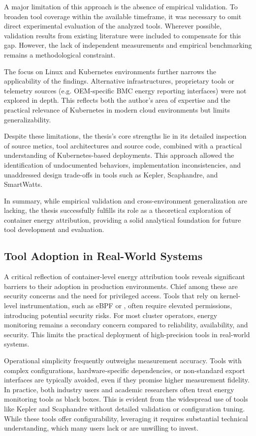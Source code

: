 A major limitation of this approach is the absence of empirical validation. To broaden tool coverage within the available timeframe, it was necessary to omit direct experimental evaluation of the analyzed tools. Wherever possible, validation results from existing literature were included to compensate for this gap. However, the lack of independent measurements and empirical benchmarking remains a methodological constraint.

The focus on Linux and Kubernetes environments further narrows the applicability of the findings. Alternative infrastructures, proprietary tools or telemetry sources (e.g. OEM-specific BMC energy reporting interfaces) were not explored in depth. This reflects both the author's area of expertise and the practical relevance of Kubernetes in modern cloud environments but limits generalizability.

Despite these limitations, the thesis’s core strengths lie in its detailed inspection of source metics, tool architectures and source code, combined with a practical understanding of Kubernetes-based deployments. This approach allowed the identification of undocumented behaviors, implementation inconsistencies, and unaddressed design trade-offs in tools such as Kepler, Scaphandre, and SmartWatts.

In summary, while empirical validation and cross-environment generalization are lacking, the thesis successfully fulfills its role as a theoretical exploration of container energy attribution, providing a solid analytical foundation for future tool development and evaluation.

\subsection{Tool Adoption in Real-World Systems}

A critical reflection of container-level energy attribution tools reveals significant barriers to their adoption in production environments. Chief among these are security concerns and the need for privileged access. Tools that rely on kernel-level instrumentation, such as eBPF or , often require elevated permissions, introducing potential security risks. For most cluster operators, energy monitoring remains a secondary concern compared to reliability, availability, and security. This limits the practical deployment of high-precision tools in real-world systems.

Operational simplicity frequently outweighs measurement accuracy. Tools with complex configurations, hardware-specific dependencies, or non-standard export interfaces are typically avoided, even if they promise higher measurement fidelity. In practice, both industry users and academic researchers often treat energy monitoring tools as black boxes. This is evident from the widespread use of tools like Kepler and Scaphandre without detailed validation or configuration tuning. While these tools offer configurability, leveraging it requires substantial technical understanding, which many users lack or are unwilling to invest.

